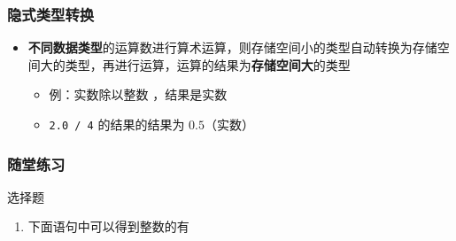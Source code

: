 \begin{frame}[fragile]
    \frametitle{隐式类型转换}

    \begin{itemize}[<+->]
        \item
            \textbf{不同数据类型}的运算数进行算术运算，则存储空间小的类型自动转换为存储空间大的类型，再进行运算，运算的结果为\textbf{存储空间大}的类型

            \begin{itemize}
                \item 例：实数除以整数 ，结果是实数
                \item \lstinline|2.0 / 4| 的结果的结果为 $0.5$（实数）
            \end{itemize}

    \end{itemize}
\end{frame}

\begin{frame}[fragile]
    \frametitle{随堂练习}

    \begin{exampleblock}{选择题}

        \begin{enumerate}
            \item 下面语句中可以得到整数的有


        \end{enumerate}

    \end{exampleblock}
\end{frame}


